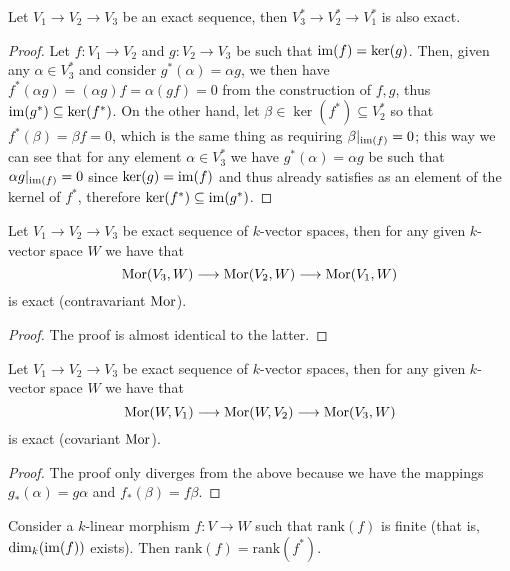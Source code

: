 \begin{proposition}
Let \(V_1 \to V_2 \to V_3\) be an exact sequence, then \(V_3^\ast \to
V_2^\ast \to V_1^\ast\) is also exact.
\end{proposition}

\begin{proof}
Let \(f: V_1 \to V_2\) and \(g: V_2 \to V_3\) be such that \(\operatorname{im}(f) =
\ker(g)\). Then, given any \(\alpha \in V_3^\ast\) and consider
\(g^\ast(\alpha) = \alpha  g\), we then have \(f^\ast(\alpha  g) =
(\alpha  g)  f = \alpha  (g  f) = 0\) from the
construction of \(f, g\), thus \(\operatorname{im}(g^\ast) \subseteq \ker(f^\ast)\). On the
other hand, let \(\beta \in \ker(f^\ast) \subseteq V_2^\ast\) so that
\(f^\ast(\beta) = \beta  f = 0\), which is the same thing as requiring
\(\beta|_{\operatorname{im}(f)} = 0\); this way we can see that for any element \(\alpha \in
V_3^\ast\) we have \(g^\ast(\alpha) = \alpha  g\) be such that \(\alpha
  g|_{\operatorname{im}(f)} = 0\) since \(\ker(g) = \operatorname{im}(f)\) and thus already satisfies
as an element of the kernel of \(f^\ast\), therefore \(\ker(f^\ast) \subseteq
\operatorname{im}(g^\ast)\).
\end{proof}

\begin{proposition}
Let \(V_1 \to V_2 \to V_3\) be exact sequence of \(k\)-vector spaces, then for
any given \(k\)-vector space \(W\) we have that
\[
  \operatorname{Mor}(V_3, W) \longrightarrow \operatorname{Mor}(V_2, W) \longrightarrow \operatorname{Mor}(V_1, W)
\]
is exact (contravariant \(\operatorname{Mor}\)).
\end{proposition}

\begin{proof}
The proof is almost identical to the latter.
\end{proof}

\begin{proposition}
Let \(V_1 \to V_2 \to V_3\) be exact sequence of \(k\)-vector spaces, then for
any given \(k\)-vector space \(W\) we have that
\[
  \operatorname{Mor}(W, V_1) \longrightarrow \operatorname{Mor}(W, V_2) \longrightarrow \operatorname{Mor}(V_3, W)
\]
is exact (covariant \(\operatorname{Mor}\)).
\end{proposition}

\begin{proof}
The proof only diverges from the above because we have the mappings
\(g_\ast(\alpha) = g  \alpha\) and \(f_\ast(\beta) = f  \beta\).
\end{proof}

\begin{proposition}
Consider a \(k\)-linear morphism \(f : V \to W\) such that \(\mathrm{rank}(f)\) is
finite (that is, \(\dim_k(\operatorname{im}(f))\) exists). Then \(\mathrm{rank}(f) =
\mathrm{rank}(f^\ast)\).
\end{proposition}

